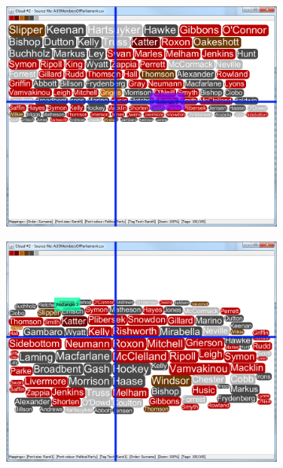 \begin{figure}[!htb]
\centering
\begin{subfigure}{.5\textwidth}
  \centering
  \includegraphics[scale=0.25]{Experiment1/Trial1/C1S1L2.png}
\end{subfigure}%
\begin{subfigure}{.5\textwidth}
  \centering
  \includegraphics[scale=0.25]{Experiment1/Trial1/C1S1L1.png}
\end{subfigure}
\begin{subfigure}{.5\textwidth}
  \centering

\end{subfigure}
\end{figure}
